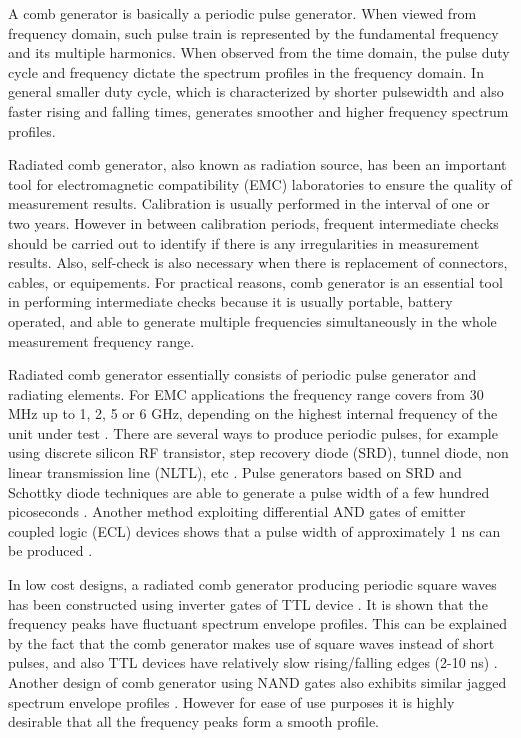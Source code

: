\documentclass{pj}
\begin{document}
A comb generator is basically a periodic pulse generator. When viewed from frequency domain, such pulse train is represented by the fundamental frequency and its multiple harmonics. When observed from the time domain, the pulse duty cycle and frequency dictate the spectrum profiles in  the frequency domain. In general smaller duty cycle, which is characterized by shorter pulsewidth and also faster rising and falling times, generates smoother and higher frequency spectrum profiles. 

Radiated comb generator, also known as radiation source, has been an important tool for electromagnetic compatibility (EMC) laboratories to ensure the quality of measurement results. Calibration is usually performed in the interval of one or two years. However in between calibration periods, frequent intermediate checks should be carried out to identify if there is any irregularities in measurement results. Also, self-check is also necessary when there is replacement of connectors, cables, or equipements. For practical reasons, comb generator is an essential tool in performing intermediate checks because it is usually portable, battery operated, and able to generate multiple frequencies simultaneously in the whole measurement frequency range.

Radiated comb generator essentially consists of periodic pulse generator and radiating elements. For EMC applications the frequency range covers from 30 MHz up to 1, 2, 5 or 6 GHz, depending on the highest internal frequency of the unit under test \cite{IEC2015}. There are several ways to produce periodic pulses, for example using discrete silicon RF transistor, step recovery diode (SRD), tunnel diode, non linear transmission line (NLTL), etc \cite{JamesRAndrews2008}. Pulse generators based on SRD and Schottky diode techniques are able to generate a pulse width of a few hundred picoseconds \cite{Miao2003}\cite{Zhou2015}\cite{Maxwell2008}.  Another method exploiting differential AND gates of emitter coupled logic (ECL) devices shows that a pulse width of approximately 1 ns can be produced \cite{15259}. 

In low cost designs, a radiated comb generator producing periodic square waves has been constructed using inverter gates of TTL device \cite{Dau-Chyrh2013}. It is shown that the frequency peaks have fluctuant spectrum envelope profiles. This can be explained by the fact that the comb generator makes use of square waves instead of short pulses, and also TTL devices have relatively slow rising/falling edges (2-10 ns) \cite{Montrose1999}. Another design of comb generator using NAND gates also exhibits similar jagged spectrum envelope profiles \cite{Ungvichian2006}. However for ease of use purposes  it is highly desirable that all the frequency peaks form a smooth profile.
\end{document}
